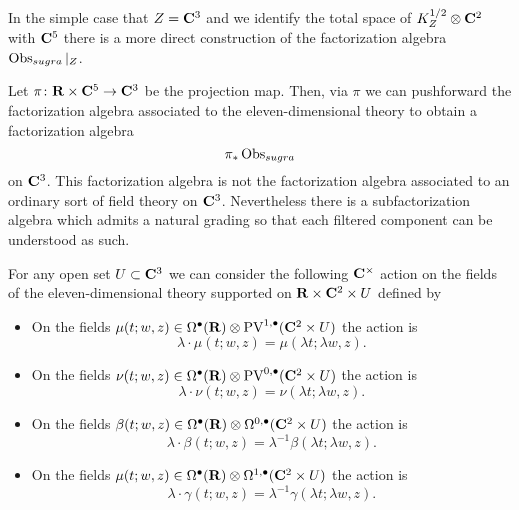 \documentclass[11pt]{amsart}
\begin{document}
\parsec[s:flat]

%

In the simple case that $Z = \mathbf{C}^3$ and we identify the total space of $K^{1/2}_Z \otimes \mathbf{C}^2$ with $\mathbf{C}^5$ there is a more direct construction of the factorization algebra $\operatorname{Obs}_{sugra}|_{Z}$. 

Let $\pi \colon \mathbf{R} \times \mathbf{C}^5 \to \mathbf{C}^3$ be the projection map.
Then, via $\pi$ we can pushforward the factorization algebra associated to the eleven-dimensional theory to obtain a factorization algebra
\[
\pi_* \operatorname{Obs}_{sugra} 
\]
on $\mathbf{C}^3$.
This factorization algebra is not the factorization algebra associated to an ordinary sort of field theory on $\mathbf{C}^3$. 
Nevertheless there is a subfactorization algebra which admits a natural grading so that each filtered component can be understood as such.

For any open set $U \subset \mathbf{C}^3$ we can consider the following $\mathbf{C}^\times$ action on the fields of the eleven-dimensional theory supported on $\mathbf{R} \times \mathbf{C}^2 \times U$ defined by
\begin{itemize}
\item On the fields $\mu(t;w,z) \in \Omega^\bullet(\mathbf{R}) \otimes {\rm PV}^{1,\bullet}(\mathbf{C}^2 \times U)$ the action is
\[
\lambda \cdot \mu(t;w,z) = \mu(\lambda t;\lambda w , z).
\]
\item On the fields $\nu(t;w,z) \in \Omega^\bullet(\mathbf{R}) \otimes {\rm PV}^{0,\bullet}(\mathbf{C}^2 \times U)$ the action is
\[
\lambda \cdot \nu(t;w,z) = \nu(\lambda t;\lambda w , z).
\]
\item On the fields $\beta(t;w,z) \in \Omega^\bullet(\mathbf{R}) \otimes \Omega^{0,\bullet}(\mathbf{C}^2 \times U)$ the action is
\[
\lambda \cdot \beta(t;w,z) = \lambda^{-1} \beta(\lambda t;\lambda w , z).
\]
\item On the fields $\mu(t;w,z) \in \Omega^\bullet(\mathbf{R}) \otimes \Omega^{1,\bullet}(\mathbf{C}^2 \times U)$ the action is
\[
\lambda \cdot \gamma(t;w,z) = \lambda^{-1} \gamma(\lambda t;\lambda w , z).
\]
\end{itemize}
\end{document}
